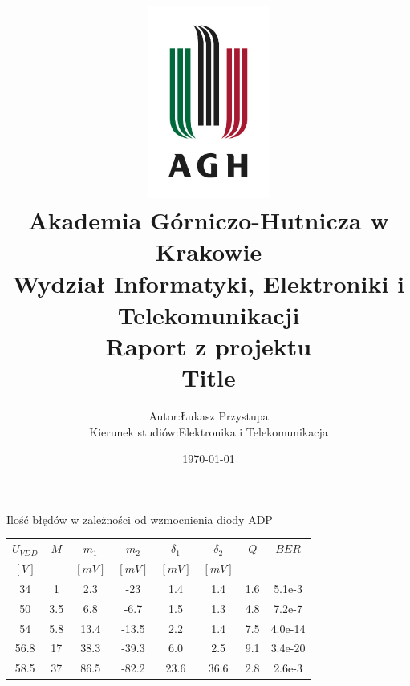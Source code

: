 \documentclass[12pt]{article}
\title{
    \includegraphics[width = 0.3\textwidth]{agh_logo.jpg}\\
    \textbf{Akademia Górniczo-Hutnicza w Krakowie}\\
    Wydział Informatyki, Elektroniki i  Telekomunikacji\\\vspace{2cm}
    \textbf{Raport z projektu}\\
    Title
}
\author{
    \begin{tabularx}{\textwidth}{l l}
    Autor: &Łukasz Przystupa\\
    Kierunek studiów: & Elektronika i Telekomunikacja\\
    \end{tabularx}
}
\date{\vspace{2cm}\today}
\numberwithin{equation}{section}
\begin{document}
    \begin{table}[!ht]
        \vspace{4cm}
        \centering
        Ilość błędów w zależności od wzmocnienia diody ADP\\
        \begin{tabular}{|c|c|c|c|c|c|c|c|}\hline
            $U_{VDD}$ & $M$ & $m_{1}$ & $m_{2}$ & $\delta_1$ & $\delta_2$ & $Q$ & $BER$\\
                 $[V]$  &     & $[mV]$    & $[mV]$    & $[mV]$       & $[mV]$       &     &\\\hline
            34      & 1     & 2.3   & -23       & 1.4   & 1.4   & 1.6 & 5.1e-3  \\\hline
            50      & 3.5   & 6.8   & -6.7      & 1.5   & 1.3   & 4.8 & 7.2e-7  \\\hline
            54      & 5.8   & 13.4  & -13.5     & 2.2   & 1.4   & 7.5 & 4.0e-14 \\\hline
            56.8    & 17    & 38.3  & -39.3     & 6.0   & 2.5   & 9.1 & 3.4e-20 \\\hline
            58.5    & 37    & 86.5  & -82.2     & 23.6  & 36.6  & 2.8 & 2.6e-3  \\\hline
        \end{tabular}
    \end{table}


    \begin{figure}[!ht]
        \centering
    \end{figure}
    \pagestyle{empty}
\end{document}
